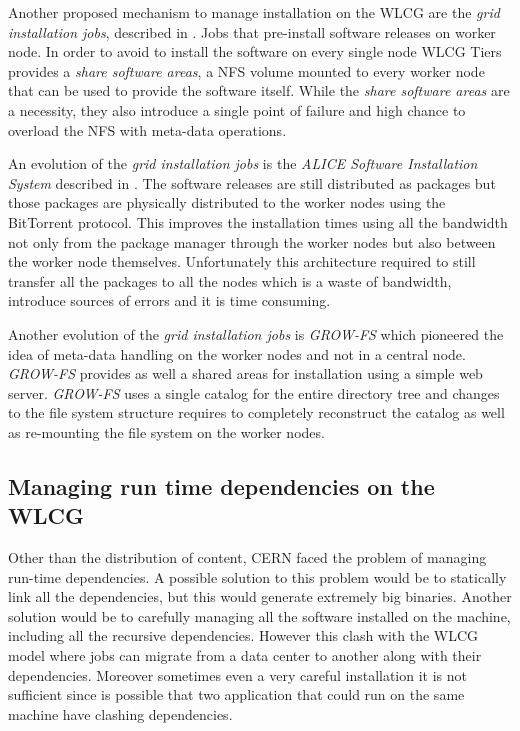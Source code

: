 Another proposed mechanism to manage installation on the WLCG are the
\textit{grid installation jobs}, described in \cite{jakob:cvmfs}. Jobs that
pre-install software releases on worker node. In order to avoid to install the
software on every single node WLCG Tiers provides a \textit{share software
areas}, a NFS volume mounted to every worker node that can be used to provide
the software itself. While the \textit{share software areas} are a necessity,
they also introduce a single point of failure and high chance to overload the
NFS with meta-data operations.

An evolution of the \textit{grid installation jobs} is the \textit{ALICE
Software Installation System} described in \cite{jakob:cvmfs}. The software
releases are still distributed as packages but those packages are physically
distributed to the worker nodes using the BitTorrent protocol. This improves
the installation times using all the bandwidth not only from the package
manager through the worker nodes but also between the worker node themselves.
Unfortunately this architecture required to still transfer all the packages to
all the nodes which is a waste of bandwidth, introduce sources of errors and it
is time consuming.

Another evolution of the \textit{grid installation jobs} is \textit{GROW-FS}
\cite{grow-fs} which pioneered the idea of meta-data handling on the worker
nodes and not in a central node. \textit{GROW-FS} provides as well a shared
areas for installation using a simple web server. \textit{GROW-FS} uses a
single catalog for the entire directory tree and changes to the file system
structure requires to completely reconstruct the catalog as well as re-mounting
the file system on the worker nodes.

\subsection{Managing run time dependencies on the WLCG} \label{subsec:soaruntime}

Other than the distribution of content, CERN faced the problem of managing
run-time dependencies. A possible solution to this problem would be to
statically link all the dependencies, but this would generate extremely big
binaries.  Another solution would be to carefully managing all the software
installed on the machine, including all the recursive dependencies. However this
clash with the WLCG model where jobs can migrate from a data center to another
along with their dependencies.  Moreover sometimes even a very careful
installation it is not sufficient since is possible that two application that
could run on the same machine have clashing dependencies.

